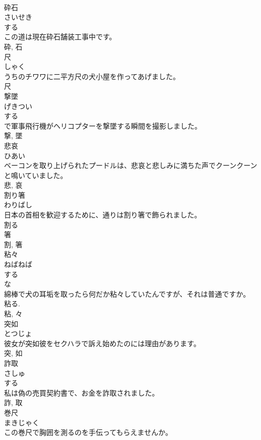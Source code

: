 \documentclass[8pt]{extreport}
\begin{document}
\begin{CJK}{UTF8}{min}
\\	砕石	
\\	さいせき	
\\	する 
\\	この道は現在砕石舗装工事中です。	
\\	砕, 石	
\\	尺	
\\	しゃく	
\\	うちのチワワに二平方尺の犬小屋を作ってあげました。	
\\	尺	
\\	撃墜	
\\	げきつい	
\\	する 
\\	で軍事飛行機がヘリコプターを撃墜する瞬間を撮影しました。	
\\	撃, 墜	
\\	悲哀	
\\	ひあい	
\\	ベーコンを取り上げられたプードルは、悲哀と悲しみに満ちた声でクーンクーンと鳴いていました。	
\\	悲, 哀	
\\	割り箸	
\\	わりばし	
\\	日本の首相を歓迎するために、通りは割り箸で飾られました。	
\\	割る 
\\	箸 
\\	割, 箸	
\\	粘々	
\\	ねばねば	
\\	する 
\\	な 
\\	綿棒で犬の耳垢を取ったら何だか粘々していたんですが、それは普通ですか。	
\\	粘る. 
\\	粘, 々	
\\	突如	
\\	とつじょ	
\\	彼女が突如彼をセクハラで訴え始めたのには理由があります。	
\\	突, 如	
\\	詐取	
\\	さしゅ	
\\	する 
\\	私は偽の売買契約書で、お金を詐取されました。	
\\	詐, 取	
\\	巻尺	
\\	まきじゃく	
\\	この巻尺で胸囲を測るのを手伝ってもらえませんか。	

\end{CJK}
\end{document}
